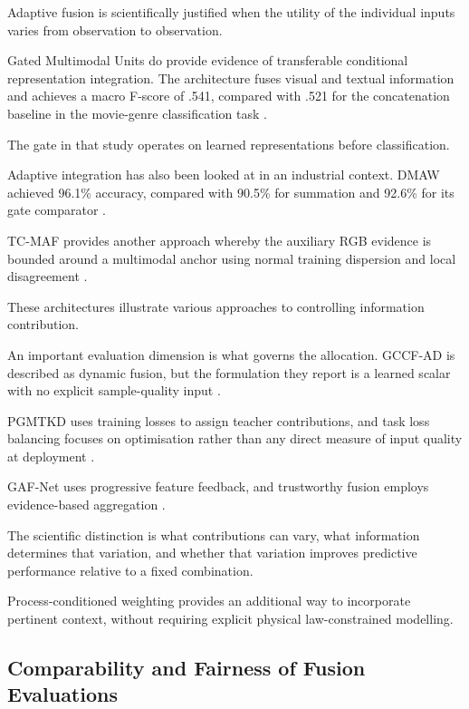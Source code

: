 Adaptive fusion is scientifically justified when the utility of the individual inputs varies from
observation to observation.

Gated Multimodal Units do provide evidence of transferable conditional representation integration.
The architecture fuses visual and textual information and achieves a macro F-score of .541, compared
with .521 for the concatenation baseline in the movie-genre classification task \parencite[Section~3.1, Table~2]{P006}.

The gate in that study operates on learned representations before classification.

Adaptive integration has also been looked at in an industrial context. DMAW achieved 96.1\%
accuracy, compared with 90.5\% for summation and 92.6\% for its gate comparator \parencite[Table~V]{P003}.

TC-MAF provides another approach whereby the auxiliary RGB evidence is bounded around a multimodal
anchor using normal training dispersion and local disagreement \parencite[Section~3.3, Equations~2--4]{P026}.

These architectures illustrate various approaches to controlling information contribution.

An important evaluation dimension is what governs the allocation. GCCF-AD is described as dynamic
fusion, but the formulation they report is a learned scalar with no explicit sample-quality input
\parencite[p.~149226, Equation~8]{P038}.

PGMTKD uses training losses to assign teacher contributions, and task loss balancing focuses on
optimisation rather than any direct measure of input quality at deployment
\parencite{Li2025PGMTKD,P045}.

GAF-Net uses progressive feature feedback, and trustworthy fusion employs evidence-based aggregation
\parencite{Huang2026Rolling,Ying2025Trustworthy}.

The scientific distinction is what contributions can vary, what information determines that
variation, and whether that variation improves predictive performance relative to a fixed
combination.

Process-conditioned weighting provides an additional way to incorporate pertinent context, without
requiring explicit physical law-constrained modelling.

\subsection{Comparability and Fairness of Fusion Evaluations}

